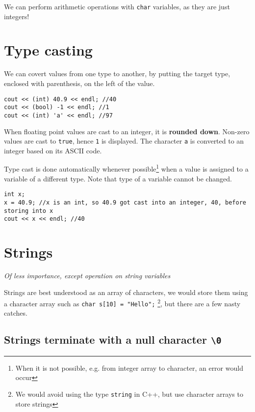We can perform arithmetic operations with \texttt{char} variables, as they are just integers! 

\section{Type casting}

We can covert values from one type to another, by putting the target type, enclosed with parenthesis, on the left of the value.

\begin{lstlisting}
cout << (int) 40.9 << endl; //40
cout << (bool) -1 << endl; //1
cout << (int) 'a' << endl; //97
\end{lstlisting}

When floating point values are cast to an integer, it is \textbf{rounded down}. Non-zero values are cast to \texttt{true}, hence \texttt{1} is displayed. The character \texttt{a} is converted to an integer based on its ASCII code.

Type cast is done automatically whenever possible\footnote{When it is not possible, e.g. from integer array to character, an error would occur} when a value is assigned to a variable of a different type. Note that type of a variable cannot be changed. 

\begin{lstlisting}
int x;
x = 40.9; //x is an int, so 40.9 got cast into an integer, 40, before storing into x
cout << x << endl; //40
\end{lstlisting}

\section{Strings}

\textit{Of less importance, except operation on string variables}
\vspace{6mm}

Strings are best understood as an array of characters, we would store them using a character array such as  \texttt{char s[10] = "Hello";} \footnote{We would avoid using the type \texttt{string} in C++, but use character arrays to store strings}, but there are a few nasty catches.

\subsection*{Strings terminate with a null character \texttt{\textbackslash 0}}

